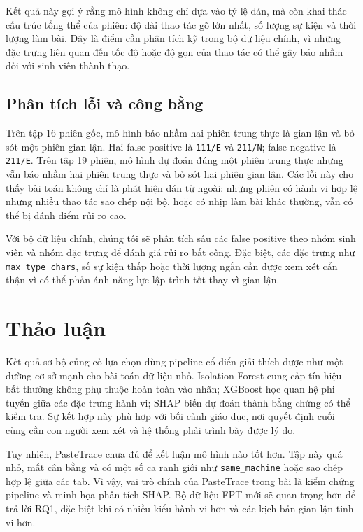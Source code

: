 \documentclass[runningheads]{llncs}
\begin{document}
Kết quả này gợi ý rằng mô hình không chỉ dựa vào tỷ lệ dán, mà còn khai thác
cấu trúc tổng thể của phiên: độ dài thao tác gõ lớn nhất, số lượng sự kiện và
thời lượng làm bài. Đây là điểm cần phân tích kỹ trong bộ dữ liệu chính, vì
những đặc trưng liên quan đến tốc độ hoặc độ gọn của thao tác có thể gây báo
nhầm đối với sinh viên thành thạo.

\subsection{Phân tích lỗi và công bằng}
Trên tập 16 phiên gốc, mô hình báo nhầm hai phiên trung thực là gian lận và bỏ
sót một phiên gian lận. Hai false positive là \texttt{111/E} và \texttt{211/N};
false negative là \texttt{211/E}. Trên tập 19 phiên, mô hình dự đoán đúng một
phiên trung thực nhưng vẫn báo nhầm hai phiên trung thực và bỏ sót hai phiên
gian lận. Các lỗi này cho thấy bài toán không chỉ là phát hiện dán từ ngoài:
những phiên có hành vi hợp lệ nhưng nhiều thao tác sao chép nội bộ, hoặc có
nhịp làm bài khác thường, vẫn có thể bị đánh điểm rủi ro cao.

Với bộ dữ liệu chính, chúng tôi sẽ phân tích sâu các false positive theo nhóm
sinh viên và nhóm đặc trưng để đánh giá rủi ro bất công. Đặc biệt, các đặc
trưng như \texttt{max\_type\_chars}, số sự kiện thấp hoặc thời lượng ngắn cần
được xem xét cẩn thận vì có thể phản ánh năng lực lập trình tốt thay vì gian
lận.

\section{Thảo luận}
\label{sec:discussion}

Kết quả sơ bộ củng cố lựa chọn dùng pipeline cổ điển giải thích được như một
đường cơ sở mạnh cho bài toán dữ liệu nhỏ. Isolation Forest cung cấp tín hiệu
bất thường không phụ thuộc hoàn toàn vào nhãn; XGBoost học quan hệ phi tuyến
giữa các đặc trưng hành vi; SHAP biến dự đoán thành bằng chứng có thể kiểm tra.
Sự kết hợp này phù hợp với bối cảnh giáo dục, nơi quyết định cuối cùng cần con
người xem xét và hệ thống phải trình bày được lý do.

Tuy nhiên, PasteTrace chưa đủ để kết luận mô hình nào tốt hơn. Tập này quá nhỏ,
mất cân bằng và có một số ca ranh giới như \texttt{same\_machine} hoặc sao chép
hợp lệ giữa các tab. Vì vậy, vai trò chính của PasteTrace trong bài là kiểm
chứng pipeline và minh họa phân tích SHAP. Bộ dữ liệu FPT mới sẽ quan trọng hơn
để trả lời RQ1, đặc biệt khi có nhiều kiểu hành vi hơn và các kịch bản gian lận
tinh vi hơn.
\end{document}
